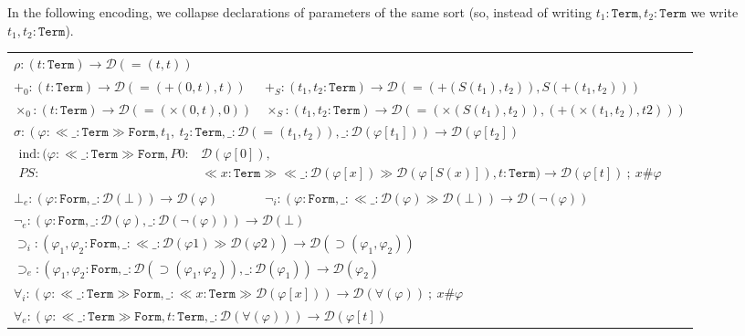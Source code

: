 \documentclass[11pt,a4paper]{amsart}
\newcounter{s}
\newcommand{\absort}[2]{\ensuremath{\ll\!\!#1\!\!\gg #2}}
\newcommand{\fresh}[2]{#1 \# #2}
\newcommand{\prf}{\ensuremath{\mathcal{D}}}
\newcommand{\Trm}{\texttt{Term}}
\newcommand{\Frm}{\texttt{Form}}
\begin{document}
In the following encoding, we collapse declarations of parameters of the same sort (so, instead of
writing $t_1 : \Trm, t_2: \Trm$ we write $t_1, t_2 : \Trm$).
\begingroup
\small
\begin{longtable}{ll}
\multicolumn{2}{l}{$\rho : (t : \Trm) \to \prf(=(t,t))$}\\[4pt]
$+_0 : (t : \Trm) \to \prf(=(+(0,t),t))$ & 
$+_S : (t_1, t_2 : \Trm) \to \prf(=(+(S(t_1),t_2)),S(+(t_1,t_2)))$\\[4pt]
$\times_0 : (t : \Trm) \to \prf(=(\times(0,t),0))$ &
$\times_S : (t_1, t_2 : \Trm) \to \prf(=(\times(S(t_1),t_2)),(+(\times(t_1,t_2),t2)))$\\[4pt]
\multicolumn{2}{l}{$\sigma : (\varphi {:} \absort{\_{:}\Trm}\Frm,t_1,\ t_2:\Trm,\_:\prf(=\!(t_1,t_2)),\_ :\prf(\varphi[t_1])) \to \prf(\varphi[t_2])$} \\[4pt]
\multicolumn{2}{l}{$\begin{aligned}\text{ind} : (\varphi {:}\absort{\_{:}\Trm}{\Frm},P0:&\prf(\varphi[0]),\\PS{:}&\absort{x{:}\Trm}{\absort{\_{:}\prf(\varphi[x])}{\prf(\varphi[S(x)])}},t{:}\Trm)
    \to \prf(\varphi[t]) \ ; \ \fresh{x}{\varphi}
\end{aligned}$}\\[6pt]
$\bot_e : (\varphi : \Frm, \_:\prf(\bot)) \to \prf(\varphi)$ &
$\neg_i : (\varphi {:} \Frm,\_:\absort{\_{:}\prf(\varphi)}{\prf(\bot)}) \to \prf(\neg(\varphi))$\\[4pt]
\multicolumn{2}{l}{$\neg_e  : (\varphi : \Frm, \_ :\prf(\varphi), \_ :\prf(\neg(\varphi))) \to \prf(\bot)$}\\[4pt]
\multicolumn{2}{l}{$\supset_i : (\varphi_1, \varphi_2 : \Frm, \_:\absort{\_{:}\prf(\varphi1)}{\prf(\varphi2)}) \to \prf(\supset(\varphi_1,\varphi_2))$}\\[4pt]
\multicolumn{2}{l}{$\supset_e : (\varphi_1, \varphi_2 : \Frm, \_ : \prf(\supset(\varphi_1,\varphi_2)), \_ : \prf(\varphi_1)) \to \prf(\varphi_2)$}\\[4pt]
\multicolumn{2}{l}{$\forall_i  : (\varphi : \absort{\_{:}\Trm}{\Frm},\_ :\absort{x{:}\Trm}{\prf(\varphi[x])}) \to \prf(\forall (\varphi)) \ ; \ \fresh{x}{\varphi}$}\\[4pt]
\multicolumn{2}{l}{$\forall_e  : (\varphi : \absort{\_{:}\Trm}{\Frm}, t : \Trm, \_ : \prf(\forall(\varphi))) \to \prf(\varphi[t])$}
\end{longtable}
\endgroup
\end{document}
